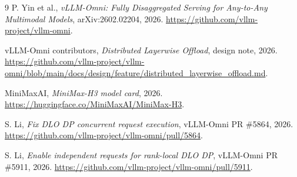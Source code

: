 \documentclass[10pt]{article}
\begin{document}
\begin{thebibliography}{9}
P. Yin et al., \emph{vLLM-Omni: Fully Disaggregated Serving for Any-to-Any
Multimodal Models}, arXiv:2602.02204, 2026.
\url{https://github.com/vllm-project/vllm-omni}.

vLLM-Omni contributors, \emph{Distributed Layerwise Offload}, design note,
2026. \url{https://github.com/vllm-project/vllm-omni/blob/main/docs/design/feature/distributed_layerwise_offload.md}.

MiniMaxAI, \emph{MiniMax-H3 model card}, 2026.
\url{https://huggingface.co/MiniMaxAI/MiniMax-H3}.

S. Li, \emph{Fix DLO DP concurrent request execution}, vLLM-Omni PR \#5864,
2026. \url{https://github.com/vllm-project/vllm-omni/pull/5864}.

S. Li, \emph{Enable independent requests for rank-local DLO DP}, vLLM-Omni PR
\#5911, 2026. \url{https://github.com/vllm-project/vllm-omni/pull/5911}.
\end{thebibliography}
\end{document}
